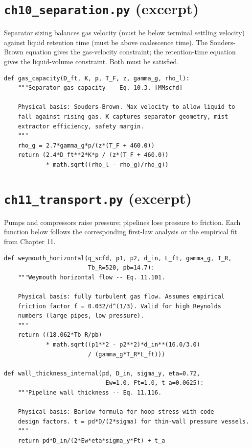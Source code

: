 \documentclass[11pt,a4paper,openany]{book}
\newcommand{\code}[1]{\texttt{#1}}
\begin{document}
\section{\code{ch10\_separation.py} (excerpt)}

\begin{theory}
Separator sizing balances gas velocity (must be below terminal
settling velocity) against liquid retention time (must be above
coalescence time). The Souders-Brown equation gives the gas-velocity
constraint; the retention-time equation gives the liquid-volume
constraint. Both must be satisfied.
\end{theory}

\begin{lstlisting}
def gas_capacity(D_ft, K, p, T_F, z, gamma_g, rho_l):
    """Separator gas capacity -- Eq. 10.3. [MMscfd]

    Physical basis: Souders-Brown. Max velocity to allow liquid to
    fall against rising gas. K captures separator geometry, mist
    extractor efficiency, safety margin.
    """
    rho_g = 2.7*gamma_g*p/(z*(T_F + 460.0))
    return (2.4*D_ft**2*K*p / (z*(T_F + 460.0))
            * math.sqrt((rho_l - rho_g)/rho_g))
\end{lstlisting}

\section{\code{ch11\_transport.py} (excerpt)}

\begin{theory}
Pumps and compressors raise pressure; pipelines lose pressure to
friction. Each function below follows the corresponding first-law
analysis or the empirical fit from Chapter 11.
\end{theory}

\begin{lstlisting}
def weymouth_horizontal(q_scfd, p1, p2, d_in, L_ft, gamma_g, T_R,
                        Tb_R=520, pb=14.7):
    """Weymouth horizontal flow -- Eq. 11.101.

    Physical basis: fully turbulent gas flow. Assumes empirical
    friction factor f = 0.032/d^(1/3). Valid for high Reynolds
    numbers (large pipes, low pressure).
    """
    return ((18.062*Tb_R/pb)
            * math.sqrt((p1**2 - p2**2)*d_in**(16.0/3.0)
                        / (gamma_g*T_R*L_ft)))

def wall_thickness_internal(pd, D_in, sigma_y, eta=0.72,
                             Ew=1.0, Ft=1.0, t_a=0.0625):
    """Pipeline wall thickness -- Eq. 11.116.

    Physical basis: Barlow formula for hoop stress with code
    design factors. t = pd*D/(2*sigma) for thin-wall pressure vessels.
    """
    return pd*D_in/(2*Ew*eta*sigma_y*Ft) + t_a
\end{lstlisting}
\end{document}
